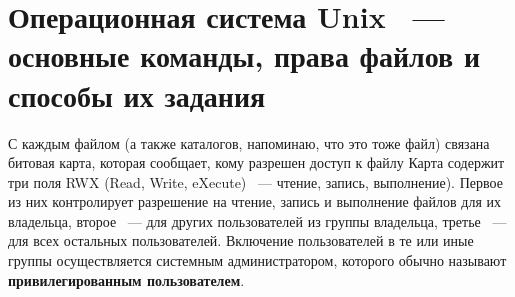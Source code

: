 \documentclass[11pt]{article}
\begin{document}
	\section{Операционная система Unix ~--- основные команды, права файлов и способы их задания}
	С каждым файлом (а также каталогов, напоминаю, что это тоже файл) связана битовая карта, которая сообщает, кому разрешен доступ к файлу Карта содержит три поля RWX (Read, Write, eXecute) ~--- чтение, запись, выполнение). Первое из них контролирует разрешение на чтение, запись и выполнение файлов для их владельца, второе ~--- для других пользователей из группы владельца, третье ~--- для всех остальных пользователей. Включение пользователей в те или иные группы осуществляется системным администратором, которого обычно называют \textbf{привилегированным пользователем}.
\end{document}
